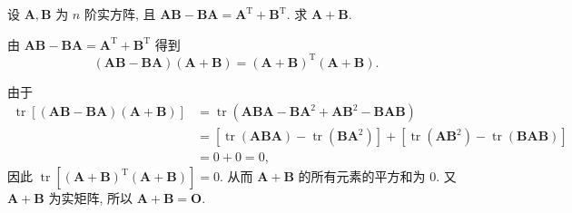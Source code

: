 \documentclass[../../main.tex]{subfiles}
\begin{document}
\begin{example}
设 $\boldsymbol{A}, \boldsymbol{B}$ 为 $n$ 阶实方阵, 且 $\boldsymbol{AB} - \boldsymbol{BA} = \boldsymbol{A}^{\mathrm{T}} + \boldsymbol{B}^{\mathrm{T}}$. 求 $\boldsymbol{A} + \boldsymbol{B}$.
\end{example}
\begin{solution}
由 $\boldsymbol{AB} - \boldsymbol{BA} = \boldsymbol{A}^{\mathrm{T}} + \boldsymbol{B}^{\mathrm{T}}$ 得到
$$
(\boldsymbol{AB} - \boldsymbol{BA})(\boldsymbol{A} + \boldsymbol{B}) = (\boldsymbol{A} + \boldsymbol{B})^{\mathrm{T}}(\boldsymbol{A} + \boldsymbol{B}).
$$

由于
$$
\begin{aligned}
\operatorname{tr}\left[(\boldsymbol{AB} - \boldsymbol{BA})(\boldsymbol{A} + \boldsymbol{B})\right] &= \operatorname{tr}\left(\boldsymbol{ABA} - \boldsymbol{BA}^2 + \boldsymbol{AB}^2 - \boldsymbol{BAB}\right) \\
&= \left[\operatorname{tr}\left(\boldsymbol{ABA}\right) - \operatorname{tr}\left(\boldsymbol{BA}^2\right)\right] + \left[\operatorname{tr}\left(\boldsymbol{AB}^2\right) - \operatorname{tr}\left(\boldsymbol{BAB}\right)\right] \\
&= 0 + 0 = 0,
\end{aligned}
$$
因此 $\operatorname{tr}\left[(\boldsymbol{A} + \boldsymbol{B})^{\mathrm{T}}(\boldsymbol{A} + \boldsymbol{B})\right] = 0$. 从而 $\boldsymbol{A} + \boldsymbol{B}$ 的所有元素的平方和为 $0$. 又 $\boldsymbol{A} + \boldsymbol{B}$ 为实矩阵, 所以 $\boldsymbol{A} + \boldsymbol{B} = \boldsymbol{O}$.

\end{solution}
\end{document}
